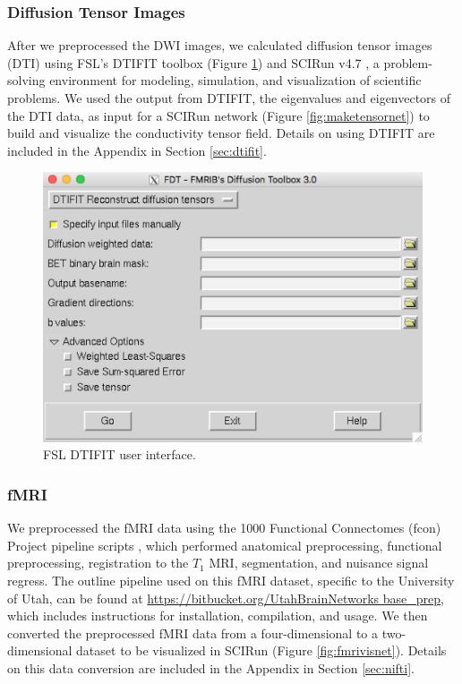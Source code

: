 \subsubsection{Diffusion Tensor Images}

After we preprocessed the DWI images, we calculated diffusion tensor images (DTI) using FSL's DTIFIT toolbox \cite{ref:dtifit} (Figure \ref{fig:dtifit}) and SCIRun v4.7 \cite{ref:scirun}, a problem-solving environment for modeling, simulation, and visualization of scientific problems. We used the output from DTIFIT, the eigenvalues and eigenvectors of the DTI data, as input for a SCIRun network (Figure \ref{fig:maketensornet}) to build and visualize the conductivity tensor field. Details on using DTIFIT are included in the Appendix in Section \ref{sec:dtifit}.

\begin{figure}[H]
    \centering
    \includegraphics[width=.8\textwidth]{Figures/DTIFIT}
    \caption{FSL DTIFIT user interface.}
    \label{fig:dtifit}
\end{figure}

\subsubsection{fMRI}
\label{sec:fmripre}

We preprocessed the fMRI data using the 1000 Functional Connectomes (fcon) Project pipeline scripts \cite{ref:fcon}, which performed anatomical preprocessing, functional preprocessing, registration to the $T_1$ MRI, segmentation, and nuisance signal regress. The outline pipeline used on this fMRI dataset, specific to the University of Utah, can be found at \url{https://bitbucket.org/UtahBrainNetworks base_prep}, which includes instructions for installation, compilation, and usage. We then converted the preprocessed fMRI data from a four-dimensional to a two-dimensional dataset to be visualized in SCIRun (Figure \ref{fig:fmrivisnet}). Details on this data conversion are included in the Appendix in Section \ref{sec:nifti}. 

